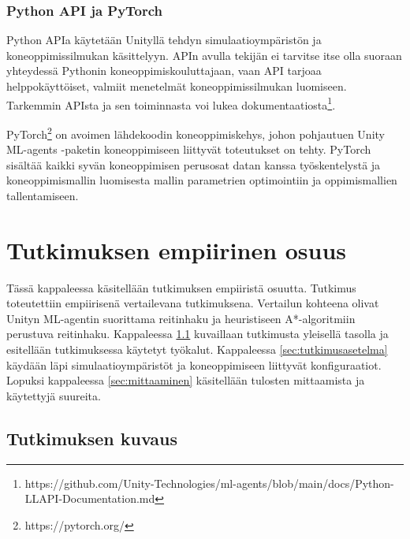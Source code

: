 \documentclass[utf8]{gradu3}
\begin{document}
\subsection{Python API ja PyTorch}

Python APIa käytetään Unityllä tehdyn simulaatioympäristön ja koneoppimissilmukan käsittelyyn. APIn avulla tekijän ei tarvitse itse olla suoraan yhteydessä Pythonin koneoppimiskouluttajaan, vaan API tarjoaa helppokäyttöiset, valmiit menetelmät koneoppimissilmukan luomiseen. Tarkemmin APIsta ja sen toiminnasta voi lukea dokumentaatiosta\footnote{https://github.com/Unity-Technologies/ml-agents/blob/main/docs/Python-LLAPI-Documentation.md}.

PyTorch\footnote{https://pytorch.org/} on avoimen lähdekoodin koneoppimiskehys, johon pohjautuen Unity ML-agents -paketin koneoppimiseen liittyvät toteutukset on tehty. PyTorch sisältää kaikki syvän koneoppimisen perusosat datan kanssa työskentelystä ja koneoppimismallin luomisesta mallin parametrien optimointiin ja oppimismallien tallentamiseen.

\chapter{Tutkimuksen empiirinen osuus}
\label{empiirinen}

Tässä kappaleessa käsitellään tutkimuksen empiiristä osuutta. Tutkimus toteutettiin empiirisenä vertailevana tutkimuksena. Vertailun kohteena olivat Unityn ML-agentin suorittama reitinhaku ja heuristiseen A*-algoritmiin perustuva reitinhaku. Kappaleessa \ref{sec:tutkimuksenkuvaus} kuvaillaan tutkimusta yleisellä tasolla ja esitellään tutkimuksessa käytetyt työkalut. Kappaleessa \ref{sec:tutkimusasetelma} käydään läpi simulaatioympäristöt ja koneoppimiseen liittyvät konfiguraatiot. Lopuksi kappaleessa \ref{sec:mittaaminen} käsitellään tulosten mittaamista ja käytettyjä suureita.

\section{Tutkimuksen kuvaus}
\label{sec:tutkimuksenkuvaus}
\end{document}
